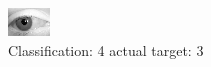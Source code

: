 \begin{figure}[h!]
\begin{center}
\includegraphics[width=0.60\columnwidth]{figures/ID2839_class_4_target_3.png}
\end{center}
\caption{ Classification: 4 actual target: 3}
\label{fig:ID2839_class_4_target_3}
\end{figure}
